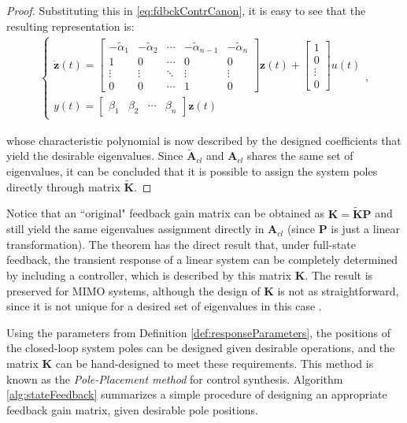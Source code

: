 \documentclass[a4paper,11pt]{book}
\numberwithin{figure}{chapter}
\numberwithin{equation}{chapter}
\numberwithin{table}{chapter}
\theoremstyle{definition}
\begin{document}
\begin{proof}
    \noindent Substituting this in \eqref{eq:fdbckContrCanon}, it is easy to see that the resulting representation is:
    \begin{align} \label{eq:SSFdbckControlCanon}
    \begin{cases}
        \dot{\bm{z}}(t) = \begin{bmatrix}
            -\tilde{\alpha}_1 & -\tilde{\alpha}_2 & \cdots & -\tilde{\alpha}_{n-1} & -\tilde{\alpha}_n \\
            1 & 0 & \cdots & 0 & 0 \\
            \vdots & \vdots & \ddots & \vdots & \vdots \\
            0 & 0 & \cdots & 1 & 0 
        \end{bmatrix} \bm{z}(t) + \begin{bmatrix}
            1 \\ 0 \\ \vdots \\ 0
        \end{bmatrix} u(t) \\
        y(t) = \begin{bmatrix} \beta_1 & \beta_2 & \cdots & \beta_n \end{bmatrix} \bm{z}(t)
    \end{cases}
    ,\end{align} 
    
    \noindent whose characteristic polynomial is now described by the designed coefficients that yield the desirable eigenvalues. Since $\tilde{\bm{A}}_{cl}$ and $\bm{A}_{cl}$ shares the same set of eigenvalues, it can be concluded that it is possible to assign the system poles directly through matrix $\tilde{\bm{K}}$.
\end{proof}

Notice that an ``original" feedback gain matrix can be obtained as $\bm{K} = \tilde{\bm{K}} \bm{P}$ and still yield the same eigenvalues assignment directly in $\bm{A}_{cl}$ (since $\bm{P}$ is just a linear transformation). The theorem has the direct result that, under full-state feedback, the transient response of a linear system can be completely determined by including a controller, which is described by this matrix $\bm{K}$. The result is preserved for MIMO systems, although the design of $\bm{K}$ is not as straightforward, since it is not unique for a desired set of eigenvalues in this case \cite{Moore:1975}. 

Using the parameters from Definition \ref{def:responseParameters}, the positions of the closed-loop system poles can be designed given desirable operations, and the matrix $\bm{K}$ can be hand-designed to meet these requirements. This method is known as the \textit{Pole-Placement method} for control synthesis. Algorithm \ref{alg:stateFeedback} summarizes a simple procedure of designing an appropriate feedback gain matrix, given desirable pole positions.
\end{document}
